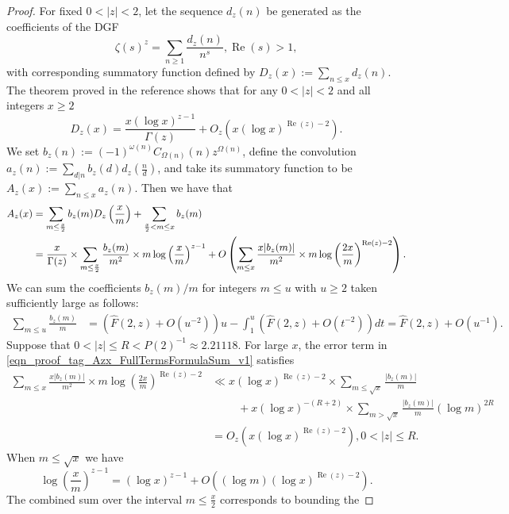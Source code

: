 \documentclass[11pt,reqno,a4letter]{article}
\numberwithin{figure}{section}
\numberwithin{table}{section}
\theoremstyle{plain}
\numberwithin{theorem}{section}
\theoremstyle{definition}
\renewcommand{\Re}{\operatorname{Re}}
\begin{document}
\begin{proof}
For fixed $0 < |z| < 2$, let the sequence $d_z(n)$ be generated as the coefficients of the DGF 
$$\zeta(s)^{z} = \sum_{n \geq 1} \frac{d_z(n)}{n^s}, \Re(s) > 1,$$ with corresponding 
summatory function defined by $D_z(x) := \sum_{n \leq x} d_z(n)$. 
The theorem proved in the reference 
\cite[Thm.\ 7.17; \S 7.4]{MV} shows that for any $0 < |z| < 2$ 
and all integers $x \geq 2$ 
\[
D_z(x) = \frac{x (\log x)^{z-1}}{\Gamma(z)} + O_z\left(x (\log x)^{\Re(z)-2}\right). 
\]
We set 
$b_z(n) := (-1)^{\omega(n)} C_{\Omega(n)}(n) z^{\Omega(n)}$, define the convolution 
$a_z(n) := \sum_{d|n} b_z(d) d_z\left(\frac{n}{d}\right)$, and take its summatory function to be 
$A_z(x) := \sum_{n \leq x} a_z(n)$. 
Then we have that 
\begin{align} 
\notag 
A_z(x) & = \sum_{m \leq \frac{x}{2}} b_z(m) D_z\left(\frac{x}{m}\right) + 
     \sum_{\frac{x}{2} < m \leq x} b_z(m) \\ 
\label{eqn_proof_tag_Azx_FullTermsFormulaSum_v1} 
     & = \frac{x}{\Gamma(z)} \times \sum_{m \leq \frac{x}{2}} 
     \frac{b_z(m)}{m^2} \times m \log\left(\frac{x}{m}\right)^{z-1} + 
     O\left(\sum_{m \leq x} \frac{x |b_z(m)|}{m^2} \times m 
     \log\left(\frac{2x}{m}\right)^{\Re(z) - 2}\right). 
\end{align} 
We can sum the coefficients $b_z(m) / m$ 
for integers $m \leq u$ with $u \geq 2$ taken sufficiently large as follows: 
\begin{align*} 
\sum_{m \leq u} \frac{b_z(m)}{m} & = \left(\widehat{F}(2, z) + O(u^{-2})\right) u - \int_1^{u} 
     \left(\widehat{F}(2, z) + O(t^{-2})\right) dt 
     = \widehat{F}(2, z) + O(u^{-1}). 
\end{align*} 
Suppose that $0 < |z| \leq R < P(2)^{-1} \approx 2.21118$. 
For large $x$, the error term in \eqref{eqn_proof_tag_Azx_FullTermsFormulaSum_v1} satisfies 
\begin{align*} 
\sum_{m \leq x} \frac{x |b_z(m)|}{m^2} \times m 
     \log\left(\frac{2x}{m}\right)^{\Re(z) - 2} & \ll 
     x (\log x)^{\Re(z) - 2} \times \sum_{m \leq \sqrt{x}} \frac{|b_z(m)|}{m} \\ 
     & \phantom{\ll x\ } + 
     x (\log x)^{-(R+2)} \times \sum_{m > \sqrt{x}} \frac{|b_z(m)|}{m} (\log m)^{2R} \\ 
     & = O_z\left(x (\log x)^{\Re(z) - 2}\right), 0 < |z| \leq R. 
\end{align*} 
When $m \leq \sqrt{x}$ we have 
\[
\log\left(\frac{x}{m}\right)^{z-1} = (\log x)^{z-1} + 
     O\left((\log m) (\log x)^{\Re(z) - 2}\right). 
\]
The combined sum over the interval $m \leq \frac{x}{2}$ corresponds to bounding the 

\end{proof}
\end{document}
